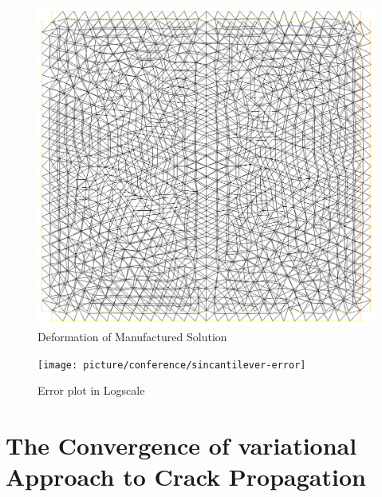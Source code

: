 \documentclass[a4paper,11pt]{article}
\begin{document}
\begin{figure}[h!]
	\centering
	\includegraphics[width=0.6\linewidth]{picture/conference/sincantilever-mesh}
	\caption{Deformation of Manufactured Solution}
	\label{fig:sincantilever-mesh}
\end{figure}
\begin{figure}[h!]
	\centering
	\texttt{[image: picture/conference/sincantilever-error]}
	\caption{Error plot in Logscale}
	\label{fig:sincantilever-error}
\end{figure}

\newpage
\section{The Convergence of variational Approach to Crack Propagation}
\end{document}
